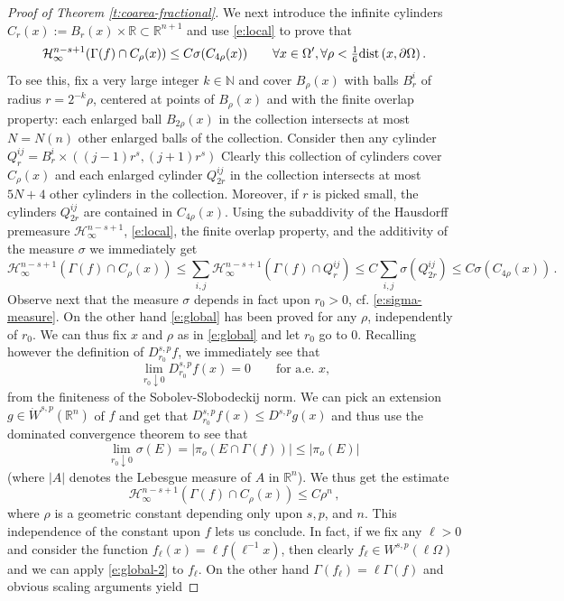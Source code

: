 \documentclass[11pt,reqno]{amsart}
\renewcommand{\H}{\mathcal{H}}
\theoremstyle{definition}
\numberwithin{equation}{section}
\begin{document}
\begin{proof}[Proof of Theorem \ref{t:coarea-fractional}]
We next introduce the infinite cylinders $C_r (x) := B_r (x) \times \mathbb R \subset \mathbb R^{n+1}$ and use \eqref{e:local} to prove that 
\begin{equation}\label{e:global}
\H^{n-s+1}_\infty (\Gamma (f) \cap C_\rho (x)) \leq C \sigma (C_{4\rho} (x))
\qquad \forall x\in \Omega', \forall \rho < \tfrac{1}{6} {\rm dist}\, (x, \partial \Omega)\, .
\end{equation}
To see this, fix a very large integer $k\in \mathbb N$ and cover $B_\rho (x)$ with balls $B_{r}^i$ of radius $r = 2^{-k} \rho$, centered at points of $B_\rho (x)$ and with the finite overlap property: each enlarged ball $B_{2\rho}(x)$ in the collection intersects at most $N = N (n)$ other enlarged balls of the collection. Consider then any cylinder $Q_{r}^{ij} = B_{r}^i \times ((j-1) r^{s}, (j+1) r^{s})$ Clearly this collection of cylinders cover $C_\rho (x)$ and each enlarged cylinder $Q_{2r}^{ij}$ in the collection intersects at most $5N+4$ other cylinders in the collection. Moreover, if $r$ is picked small, the cylinders $Q_{2r}^{ij}$ are contained in $C_{4\rho} (x)$. Using the subaddivity of the Hausdorff premeasure $\mathcal{H}^{n-s+1}_\infty$, \eqref{e:local}, the finite overlap property, and the additivity of the measure $\sigma$ we immediately get
\[
\H^{n-s+1}_\infty (\Gamma (f) \cap C_\rho (x)) 
\leq \sum_{i,j} \H^{n-s+1}_\infty (\Gamma (f) \cap Q_r^{ij})
\leq C \sum_{i,j} \sigma (Q_{2r}^{ij}) \leq C \sigma (C_{4\rho} (x))\, .
\]
Observe next that the measure $\sigma$ depends in fact upon $r_0>0$, cf. \eqref{e:sigma-measure}.  On the other hand \eqref{e:global} has been proved for any $\rho$, independently of $r_0$. We can thus fix $x$ and $\rho$ as in \eqref{e:global} and let $r_0$ go to $0$. Recalling however the definition of $D^{s,p}_{r_0} f$, we immediately see that 
\[
\lim_{r_0\downarrow 0} D^{s,p}_{r_0} f (x) = 0 \qquad \mbox{for a.e. $x$,}
\]
from the finiteness of the Sobolev-Slobodeckij norm. 
We can pick an extension $g\in \dot{W}^{s,p} (\mathbb R^n)$ of $f$ and get that $D^{s,p}_{r_0} f (x) \leq D^{s,p} g (x)$ and thus use the dominated convergence theorem to see that 
\[
\lim_{r_0\downarrow 0} \sigma (E) = |\pi_o (E\cap \Gamma (f))|
\leq |\pi_o (E)|\, 
\]
(where $|A|$ denotes the Lebesgue measure of $A$ in $\mathbb R^n$). We thus get the estimate
\begin{equation}\label{e:global-2}
\H^{n-s+1}_\infty (\Gamma (f) \cap C_\rho (x)) \leq C \rho^n\, ,
\end{equation}
where $\rho$ is a geometric constant depending only upon $s,p$, and $n$. This independence of the constant upon $f$ lets us conclude. In fact, if we fix any $\ell>0$ and consider the function $f_\ell (x) = \ell f (\ell^{-1} x)$, then clearly $f_\ell \in W^{s,p} (\ell \Omega)$ and we can apply \eqref{e:global-2} to $f_\ell$. On the other hand $\Gamma (f_\ell) = \ell \Gamma (f)$ and obvious scaling arguments yield

\end{proof}
\end{document}
